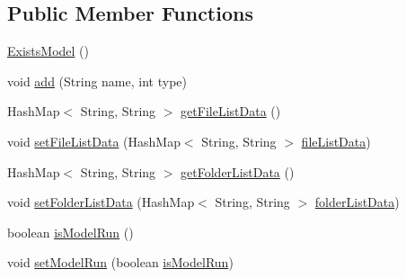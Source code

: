 \subsection*{Public Member Functions}
\begin{DoxyCompactItemize}
\item 
\hyperlink{classcom_1_1poly_1_1nlp_1_1filekommander_1_1views_1_1models_1_1_exists_model_a16ecde468dcd1c776cf5a4d09885aed7}{Exists\-Model} ()
\item 
void \hyperlink{classcom_1_1poly_1_1nlp_1_1filekommander_1_1views_1_1models_1_1_exists_model_a19031edcbad6640ed6303a102ceb5cf7}{add} (String name, int type)
\item 
Hash\-Map$<$ String, String $>$ \hyperlink{classcom_1_1poly_1_1nlp_1_1filekommander_1_1views_1_1models_1_1_exists_model_af9ddf192ccb79600171d6addf45c843b}{get\-File\-List\-Data} ()
\item 
void \hyperlink{classcom_1_1poly_1_1nlp_1_1filekommander_1_1views_1_1models_1_1_exists_model_ab04618933171d232fd9451528d3f7e21}{set\-File\-List\-Data} (Hash\-Map$<$ String, String $>$ \hyperlink{classcom_1_1poly_1_1nlp_1_1filekommander_1_1views_1_1models_1_1_exists_model_a72865eacbf48e01130d4ab3cf9d1d937}{file\-List\-Data})
\item 
Hash\-Map$<$ String, String $>$ \hyperlink{classcom_1_1poly_1_1nlp_1_1filekommander_1_1views_1_1models_1_1_exists_model_a21b19ab3f90db1f50d29f8f83761c8c3}{get\-Folder\-List\-Data} ()
\item 
void \hyperlink{classcom_1_1poly_1_1nlp_1_1filekommander_1_1views_1_1models_1_1_exists_model_ab024a6c4819c80957d9982ade1d0100f}{set\-Folder\-List\-Data} (Hash\-Map$<$ String, String $>$ \hyperlink{classcom_1_1poly_1_1nlp_1_1filekommander_1_1views_1_1models_1_1_exists_model_ad61aa992f579cc10034c3f4343e80a79}{folder\-List\-Data})
\item 
boolean \hyperlink{classcom_1_1poly_1_1nlp_1_1filekommander_1_1views_1_1models_1_1_exists_model_a39d0b5e69f0a9203689dd860b923d5d6}{is\-Model\-Run} ()
\item 
void \hyperlink{classcom_1_1poly_1_1nlp_1_1filekommander_1_1views_1_1models_1_1_exists_model_a9dc784849b9d30420f1a2ef26927dd28}{set\-Model\-Run} (boolean \hyperlink{classcom_1_1poly_1_1nlp_1_1filekommander_1_1views_1_1models_1_1_exists_model_aa20f1308ab4764740262516e4c0b544e}{is\-Model\-Run})
\end{DoxyCompactItemize}
